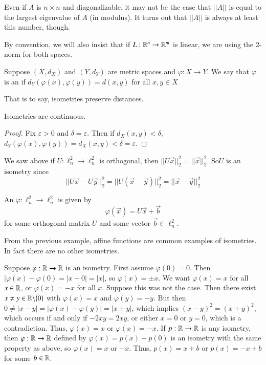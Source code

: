 Even if $A$ is $n\times n$ and diagonalizable, it may not be the case that $||A||$ is equal to the largest eigenvalue of $A$ (in modulus). It turns out that $||A||$ is always at least this number, though.

By convention, we will also insist that if $L:\mathbb R^n\rightarrow \mathbb R^m$ is linear, we are using the $2$-norm for both spaces.

\begin{defn}
    Suppose $(X,d_X)$ and $(Y,d_Y)$ are metric spaces and $\varphi:X\rightarrow Y$. We say that $\varphi$ is an  if $d_Y(\varphi(x),\varphi(y)) = d(x,y)$ for all $x,y \in X$
\end{defn}

That is to say, isometries preserve distances.

\begin{prop}
    Isometries are continuous.
\end{prop}
\begin{proof}
    Fix $\varepsilon > 0$ and $\delta = \varepsilon$. Then if $d_X(x,y) < \delta,$ $d_Y(\varphi(x),\varphi(y)) = d_X(x,y) < \delta = \varepsilon$.
\end{proof}

\begin{eg}
    We saw above if $U:\ell_n^2\rightarrow \ell_n^2$ is orthogonal, then $||U\vec{x}||_2^2 = ||\vec{x}||_2^2$. So$ U$ is an isometry since $$||U\vec{x} - U\vec{y}||_2^2 = ||U(\vec{x}-\vec{y})||_2^2 = ||\vec{x}-\vec{y}||_2^2$$
\end{eg}

\begin{defn}
    An  $\varphi:\ell_n^2\rightarrow \ell_n^2$ is given by $$\varphi(\vec{x}) = U\vec{x}+\vec{b}$$ for some orthogonal matrix $U$ and some vector $\vec{b} \in \ell_n^2$.
\end{defn}

From the previous example, affine functions are common examples of isometries. In fact there are no other isometries.

\begin{eg}
    Suppose $\varphi:\mathbb R\rightarrow \mathbb R$ is an isometry. First assume $\varphi(0) = 0$. Then $|\varphi(x)-\varphi(0) = |x-0| = |x|$, so $\varphi(x) = \pm x$. We want $\varphi(x) = x$ for all $x \in \mathbb R$, or $\varphi(x) = -x$ for all $x$. Suppose this was not the case. Then there exist $x \neq y \in \mathbb R\backslash\{0\}$ with $\varphi(x) = x$ and $\varphi(y) = -y$. But then $0 \neq |x-y| = |\varphi(x) - \varphi(y)| = |x+y|$, which implies $(x-y)^2 = (x+y)^2$, which occurs if and only if $-2xy = 2xy$, or either $x = 0$ or $y = 0$, which is a contradiction. Thus, $\varphi(x) = x$ or $\varphi(x) = -x$. If $p:\mathbb R\rightarrow \mathbb R$ is any isometry, then $\varphi:\mathbb R\rightarrow \mathbb R$ defined by $\varphi(x) = p(x) - p(0)$ is an isometry with the same property as above, so $\varphi(x) = x$ or $-x$. Thus, $p(x) = x+b$ or $p(x) = -x+b$ for some $b \in \mathbb R$.
\end{eg}

